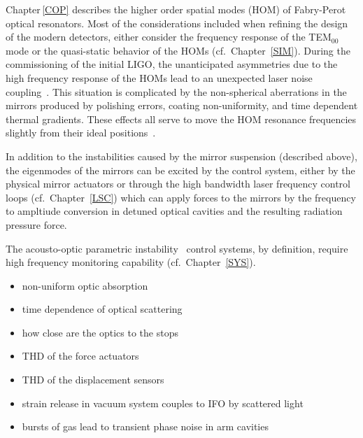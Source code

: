 Chapter\,\ref{COP} describes the higher order spatial modes (HOM) of
    Fabry-Perot optical resonators. Most of the considerations included when
    refining the design of the modern detectors, either consider the frequency
    response of the TEM$_{00}$ mode or the quasi-static behavior of the
    HOMs (cf.~Chapter~\ref{SIM}). During the commissioning
    of the initial LIGO, the unanticipated asymmetries due to the high frequency
    response of the HOMs lead to an unexpected laser noise coupling~\cite{Stefan:Thesis}.
    This situation is complicated by the non-spherical aberrations in the mirrors
    produced by polishing errors, coating non-uniformity, and time dependent
    thermal gradients. These effects all serve to move the HOM resonance frequencies
    slightly from their ideal positions~\cite{Siegman:Lasers}.

In addition to the instabilities caused by the mirror
    suspension (described above), the eigenmodes of the mirrors can be
    excited by the control system, either by the physical mirror actuators
    or through the high bandwidth laser frequency control loops
    (cf.~Chapter~\ref{LSC}) which can apply forces to the mirrors by the
    frequency to ampltiude conversion in detuned optical cavities and the
    resulting radiation pressure force.

The acousto-optic parametric instability~\cite{Matt:PI} control
    systems, by definition, require high frequency monitoring capability
    (cf.~Chapter~\ref{SYS}).

\begin{itemize}
  \item non-uniform optic absorption
  \item time dependence of optical scattering
  \item how close are the optics to the stops
  \item THD of the force actuators
  \item THD of the displacement sensors
  \item strain release in vacuum system couples to IFO by scattered light
  \item bursts of gas lead to transient phase noise in arm cavities
\end{itemize}

